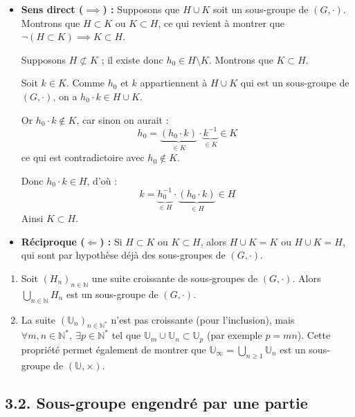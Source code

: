 \documentclass[a4paper,11pt]{article}
\newcommand{\N}{\mathbb{N}}
\newcommand{\U}{\mathbb{U}}
\begin{document}
\begin{demonstration}
\begin{itemize}
    \item \textbf{Sens direct ($\implies$) :} Supposons que $H \cup K$ soit un sous-groupe de $(G, \cdot)$. Montrons que $H \subset K$ ou $K \subset H$, ce qui revient à montrer que $\neg(H \subset K) \implies K \subset H$.
    
    Supposons $H \not\subset K$ ; il existe donc $h_0 \in H \setminus K$. Montrons que $K \subset H$.
    
    Soit $k \in K$. Comme $h_0$ et $k$ appartiennent à $H \cup K$ qui est un sous-groupe de $(G, \cdot)$, on a $h_0 \cdot k \in H \cup K$.
    
    Or $h_0 \cdot k \notin K$, car sinon on aurait :
    \[
    h_0 = \underbrace{(h_0 \cdot k)}_{\in K} \cdot \underbrace{k^{-1}}_{\in K} \in K
    \]
    ce qui est contradictoire avec $h_0 \notin K$.
    
    Donc $h_0 \cdot k \in H$, d'où :
    \[
    k = \underbrace{h_0^{-1}}_{\in H} \cdot \underbrace{(h_0 \cdot k)}_{\in H} \in H
    \]
    Ainsi $K \subset H$.
    
    \item \textbf{Réciproque ($\Longleftarrow$) :} Si $H \subset K$ ou $K \subset H$, alors $H \cup K = K$ ou $H \cup K = H$, qui sont par hypothèse déjà des sous-groupes de $(G, \cdot)$.
\end{itemize}
\end{demonstration}

\begin{remarque}
\begin{enumerate}
    \item Soit $(H_n)_{n \in \N}$ une suite croissante de sous-groupes de $(G, \cdot)$. Alors $\displaystyle\bigcup_{n \in \N} H_n$ est un sous-groupe de $(G, \cdot)$.
    \item La suite $(\U_n)_{n \in \N^*}$ n'est pas croissante (pour l'inclusion), mais $\forall m, n \in \N^*, \ \exists p \in \N^*$ tel que $\U_m \cup \U_n \subset \U_p$ (par exemple $p = mn$). Cette propriété permet également de montrer que $\U_\infty = \displaystyle\bigcup_{n \ge 1} \U_n$ est un sous-groupe de $(\U, \times)$.
\end{enumerate}
\end{remarque}

\newpage
\subsection{3.2. Sous-groupe engendré par une partie}
\end{document}
